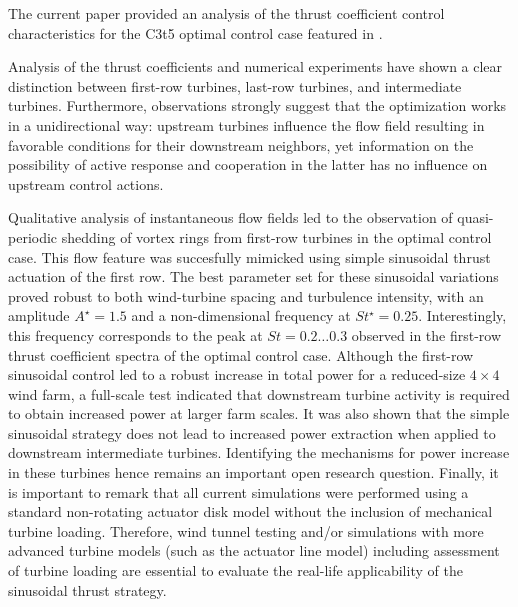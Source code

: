 \documentclass[wes, manuscript]{copernicus}
\begin{document}
\conclusions \label{sec:analysis_summ}
The current paper provided an analysis of the thrust coefficient control characteristics for the C3t5 optimal control case featured in \cite{munters2017optimal}. 

Analysis of the thrust coefficients and numerical experiments have shown a clear distinction between first-row turbines, last-row turbines, and intermediate turbines. Furthermore, observations strongly suggest that the optimization works in a unidirectional way: upstream turbines influence the flow field resulting in favorable conditions for their downstream neighbors, yet information on the possibility of active response and cooperation in the latter has no influence on upstream control actions. 

Qualitative analysis of instantaneous flow fields led to the observation of quasi-periodic shedding of vortex rings from first-row turbines in the optimal control case. This flow feature was succesfully mimicked using simple sinusoidal thrust actuation of the first row. The best parameter set for these sinusoidal variations proved robust to both wind-turbine spacing and turbulence intensity, with an amplitude $A^\star = 1.5$ and a non-dimensional frequency at $St^\star = 0.25$. Interestingly, this frequency corresponds to the peak at $St = 0.2 \dots 0.3$ observed in the first-row thrust coefficient spectra of the optimal control case. Although the first-row sinusoidal control led to a robust increase in total power for a reduced-size $4\times4$ wind farm, a full-scale test indicated that downstream turbine activity is required to obtain increased power at larger farm scales. It was also shown that the simple sinusoidal strategy does not lead to increased power extraction when applied to downstream intermediate turbines. Identifying the mechanisms for power increase in these turbines hence remains an important open research question. Finally, it is important to remark that all current simulations were performed using a standard non-rotating actuator disk model without the inclusion of mechanical turbine loading. Therefore, wind tunnel testing and/or simulations with more advanced turbine models (such as the actuator line model) including assessment of turbine loading are essential to evaluate the real-life applicability of the sinusoidal thrust strategy. 
\end{document}
